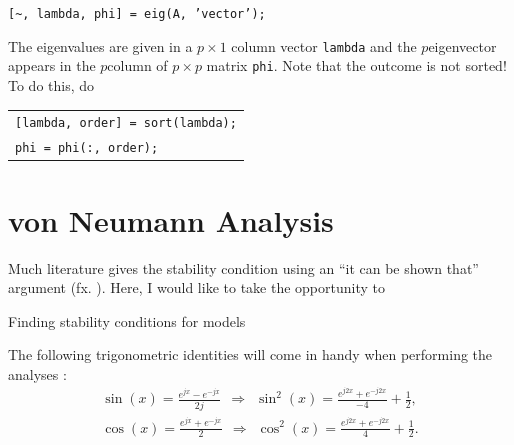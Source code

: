\begin{center}
    \texttt{[\textasciitilde, lambda, phi] = eig(A, {\color[HTML]{A100F4}'vector'});}
\end{center}
The eigenvalues are given in a $p \times 1$ column vector \texttt{lambda} and the $p$\th eigenvector appears in the $p$\th column of $p\times p$ matrix \texttt{phi}. Note that the outcome is not sorted! To do this, do 
%
\begin{center}
    \begin{tabular}{l}
    \texttt{[lambda, order] = sort(lambda);}\\
    \texttt{phi = phi(:, order);}
    \end{tabular}
\end{center}

\section{von Neumann Analysis}\label{sec:stabilityAnalysis}
Much literature gives the stability condition using an ``it can be shown that'' argument (fx. \cite{Bilbao2009}). Here, I would like to take the opportunity to 

Finding stability conditions for models

The following trigonometric identities will come in handy when performing the analyses \cite[p. 71]{Abramowitz1972}:
\begin{subequations}
    \begin{gather}
        \sin(x) = \frac{e^{jx} - e^{-jx}}{2j}\ \ \Rightarrow \ \ \sin^2(x) %
        = \frac{e^{j2x} + e^{-j2x}}{-4} + \frac{1}{2},\label{eq:sinIdentity}\\
        \cos(x) = \frac{e^{jx} + e^{-jx}}{2}\ \ \Rightarrow \ \ \cos^2(x) %
        = \frac{e^{j2x} + e^{-j2x}}{4} + \frac{1}{2}.\label{eq:cosIdentity}
    \end{gather}
\end{subequations}

